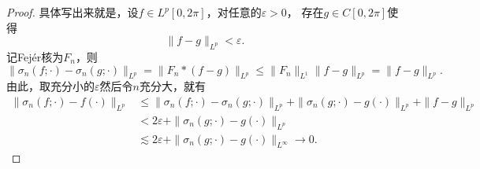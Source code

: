\begin{quiza}
\begin{enumerate}
\begin{proof}
具体写出来就是，设$f\in L^p[0,2\pi]$，对任意的$\varepsilon>0$，
存在$g\in C[0,2\pi]$使得\[\|f-g\|_{L^p}<\varepsilon.\]
记Fejér核为$F_n$，则\[\|\sigma_n(f;\cdot)-\sigma_n(g;\cdot)\|_{L^p}
=\|F_n*(f-g)\|_{L^p}\leqslant\|F_n\|_{L^1}\|f-g\|_{L^p}=\|f-g\|_{L^p}.\]
由此，取充分小的$\varepsilon$然后令$n$充分大，就有
\begin{align*}\|\sigma_n(f;\cdot)-f(\cdot)\|_{L^p}
&\leqslant\|\sigma_n(f;\cdot)-\sigma_n(g;\cdot)\|_{L^p}
+\|\sigma_n(g;\cdot)-g(\cdot)\|_{L^p}+\|f-g\|_{L^p}\\
&<2\varepsilon+\|\sigma_n(g;\cdot)-g(\cdot)\|_{L^p}\\
&\lesssim2\varepsilon+\|\sigma_n(g;\cdot)-g(\cdot)\|_{L^\infty}\to0.\end{align*}
\end{proof}
\end{enumerate}
\end{quiza}

